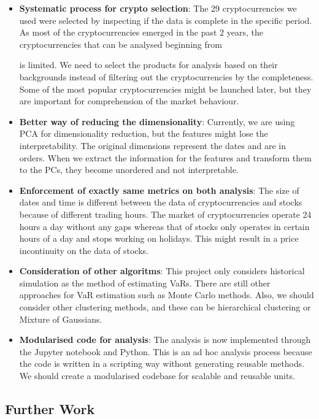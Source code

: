 \documentclass[11pt]{article} %
\theoremstyle{plain}
\theoremstyle{definition}
\begin{document}
\begin{itemize}
    \item \textbf{Systematic process for crypto selection}: The 29 cryptocurrencies we used were selected by inspecting if the data is complete in the specific period. As most of the cryptocurrencies emerged in the past 2 years, the cryptocurrencies that can be analysed beginning from \date{1st January 2016} is limited. We need to select the products for analysis based on their backgrounds instead of filtering out the cryptocurrencies by the completeness. Some of the most popular cryptocurrencies might be launched later, but they are important for comprehension of the market behaviour.
    \item \textbf{Better way of reducing the dimensionality}: Currently, we are using PCA for dimensionality reduction, but the features might lose the interpretability. The original dimensions represent the dates and are in orders. When we extract the information for the features and transform them to the PCs, they become unordered and not interpretable.
    \item \textbf{Enforcement of exactly same metrics on both analysis}: The size of dates and time is different between the data of cryptocurrencies and stocks because of different trading hours. The market of cryptocurrencies operate 24 hours a day without any gaps whereas that of stocks only operates in certain hours of a day and stops working on holidays. This might result in a price incontinuity on the data of stocks.
    \item \textbf{Consideration of other algoritms}: This project only considers historical simulation as the method of estimating VaRs. There are still other approaches for VaR estimation such as Monte Carlo methods. Also, we should consider other clustering methods, and these can be hierarchical clustering or Mixture of Gaussians.
    \item \textbf{Modularised code for analysis}: The analysis is now implemented through the Jupyter notebook and Python. This is an ad hoc analysis process because the code is written in a scripting way without generating reusable methods. We should create a modularised codebase for scalable and reusable units.
\end{itemize}

\subsection{Further Work}
\end{document}

